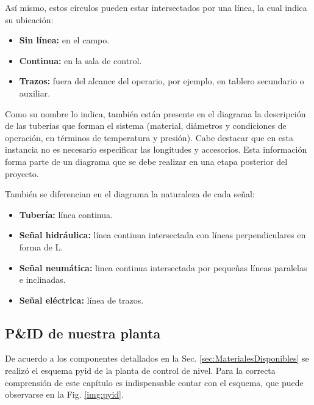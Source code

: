 Así mismo, estos círculos pueden estar intersectados por una línea, la
cual
indica su ubicación:

\begin{itemize}
 \item \textbf{Sin línea:} en el campo.
 \item \textbf{Continua:} en la sala de control.
 \item \textbf{Trazos:} fuera del alcance del operario, por ejemplo, en tablero
secundario o auxiliar.
\end{itemize}

Como su nombre lo indica, también están presente en el diagrama la descripción
de las tuberías que forman el sistema (material, diámetros y condiciones de
operación, en términos de temperatura y presión).
Cabe destacar que en esta instancia no es necesario especificar las
longitudes y accesorios.
Esta información forma parte de un diagrama que se debe realizar
en una etapa posterior del proyecto.

También se diferencian en el diagrama la naturaleza de cada señal:

\begin{itemize}
 \item \textbf{Tubería:} línea continua.
 \item \textbf{Señal hidráulica:} línea continua intersectada con líneas
perpendiculares en forma de L.
 \item \textbf{Señal neumática:} linea continua intersectada por pequeñas
líneas paralelas e inclinadas.
 \item \textbf{Señal eléctrica:} línea de trazos.
\end{itemize}

\subsection{P\&ID de nuestra planta}
De acuerdo a los componentes detallados en la Sec.
\ref{sec:MaterialesDisponibles} se realizó el esquema \gls{pyid} de la planta
de control de nivel.
Para la correcta comprensión de este capítulo es indispensable contar con el
esquema, que puede observarse en la Fig. \ref{img:pyid}.

